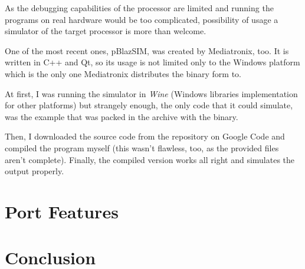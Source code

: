         As the debugging capabilities of the processor are limited and running the programs on real hardware would be too complicated, possibility of usage a simulator of the target processor is more than welcome.

        One of the most recent ones, pBlazSIM, was created by Mediatronix, too. It is written in C++ and Qt, so its usage is not limited only to the Windows platform which is the only one Mediatronix distributes the binary form to.

        At first, I was running the simulator in \emph{Wine} (Windows libraries implementation for other platforms) but strangely enough, the only code that it could simulate, was the example that was packed in the archive with the binary.

        Then, I downloaded the source code from the repository on Google Code and compiled the program myself (this wasn't flawless, too, as the provided files aren't complete). Finally, the compiled version works all right and simulates the output properly.

        

\chapter{Port Features}\label{features}

\chapter{Conclusion}\label{conclusion}


\cite{TBD}
